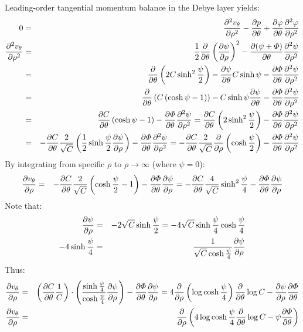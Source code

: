 Leading-order tangential momentum balance in the Debye layer yields:
\begin{eqnarray} 
0 &=& \frac{\partial ^2 v_\theta}{\partial \rho^2} - \frac{\partial p}{\partial \theta} 
 + \frac{\partial \varphi}{\partial \theta} \frac{\partial ^2\varphi}{\partial \rho^2} 
\\
\frac{\partial ^2 v_\theta}{\partial \rho^2} &=& \frac{1}{2}\frac{\partial }{\partial \theta}\left(\frac{\partial \psi}{\partial \rho}\right)^2
- \frac{\partial (\psi + \varPhi)}{\partial \theta} \frac{\partial ^2\psi}{\partial \rho^2}  
\\
 &=& \frac{\partial }{\partial \theta}\left(2C \sinh^2\frac{\psi}{2}\right)
- \frac{\partial \psi}{\partial \theta} C \sinh\psi
- \frac{\partial \varPhi}{\partial \theta} \frac{\partial ^2\psi}{\partial \rho^2}  
\\
 &=& \frac{\partial }{\partial \theta}\left(C \left(\cosh\psi - 1\right)\right)
- C \sinh\psi \frac{\partial \psi}{\partial \theta}
- \frac{\partial \varPhi}{\partial \theta} \frac{\partial ^2\psi}{\partial \rho^2}  
\\
 &=& \frac{\partial C}{\partial \theta} \left(\cosh\psi - 1\right)
- \frac{\partial \varPhi}{\partial \theta} \frac{\partial ^2\psi}{\partial \rho^2}  
 = \frac{\partial C}{\partial \theta} \left(2 \sinh^2 \frac{\psi}{2}\right)
- \frac{\partial \varPhi}{\partial \theta} \frac{\partial ^2\psi}{\partial \rho^2}  
\\
 &=& -\frac{\partial C}{\partial \theta} \frac{2}{\sqrt{C}} \left(\frac{1}{2} \sinh \frac{\psi}{2} \frac{\partial \psi}{\partial \rho}\right)
- \frac{\partial \varPhi}{\partial \theta} \frac{\partial ^2\psi}{\partial \rho^2}  
 = -\frac{\partial C}{\partial \theta} \frac{2}{\sqrt{C}} \frac{\partial }{\partial \rho}\left(\cosh \frac{\psi}{2}\right)
- \frac{\partial \varPhi}{\partial \theta} \frac{\partial ^2\psi}{\partial \rho^2}  
\end{eqnarray}
By integrating from specific $\rho$ to $\rho \rightarrow \infty$ (where $\psi = 0$):
\begin{eqnarray}
\frac{\partial v_\theta}{\partial \rho} &=& -\frac{\partial C}{\partial \theta} \frac{2}{\sqrt{C}} 
\left(\cosh \frac{\psi}{2} - 1\right) - \frac{\partial \varPhi}{\partial \theta} \frac{\partial \psi}{\partial \rho}   
= -\frac{\partial C}{\partial \theta} \frac{4}{\sqrt{C}} \sinh^2 \frac{\psi}{4} 
  - \frac{\partial \varPhi}{\partial \theta} \frac{\partial \psi}{\partial \rho}   
\end{eqnarray}
Note that:
\begin{eqnarray}
\frac{\partial \psi}{\partial \rho} &=& -2\sqrt{C}\sinh\frac{\psi}{2} = 
                       -4\sqrt{C}\sinh\frac{\psi}{4}\cosh\frac{\psi}{4}
\\
-4\sinh\frac{\psi}{4} &=& \frac{1}{\sqrt{C} \cosh\frac{\psi}{4}} \frac{\partial \psi}{\partial \rho}
\end{eqnarray}
Thus:
\begin{eqnarray}
\frac{\partial v_\theta}{\partial \rho} &=& 
  \left(\frac{\partial C}{\partial \theta} \frac{1}{C}\right) \cdot
  \left(\frac{\sinh\frac{\psi}{4}}{\cosh\frac{\psi}{4}} \frac{\partial \psi}{\partial \rho}\right)
  - \frac{\partial \varPhi}{\partial \theta} \frac{\partial \psi}{\partial \rho}
=  4\frac{\partial }{\partial \rho} \left(\log\cosh\frac{\psi}{4}\right) \frac{\partial }{\partial \theta} \log C
  - \frac{\partial \psi}{\partial \rho} \frac{\partial \varPhi}{\partial \theta}
\\
\frac{\partial v_\theta}{\partial \rho} &=& 
\frac{\partial }{\partial \rho} \left( 4\log\cosh\frac{\psi}{4} \frac{\partial }{\partial \theta} \log C
  - \psi \frac{\partial \varPhi}{\partial \theta} \right)
\end{eqnarray}


